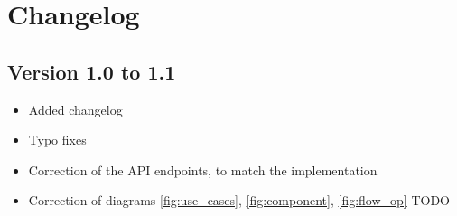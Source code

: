 \chapter{Changelog}
\section{Version 1.0 to 1.1}
\begin{itemize}
    \item Added changelog
    \item Typo fixes
    \item Correction of the API endpoints, to match the implementation
    \item Correction of diagrams \ref{fig:use_cases}, \ref{fig:component}, \ref{fig:flow_op} {\color{red} TODO}
\end{itemize}
